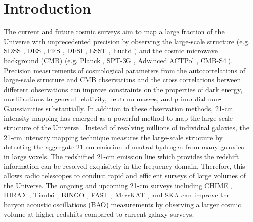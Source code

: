 \documentclass[prd,superscriptaddress,floatfix,notitlepage,nofootinbib,reprint]{revtex4-1}
\begin{document}
\maketitle

\section{Introduction}
The current and future cosmic surveys aim to map a large fraction of the 
Universe with unprecedented precision by observing the large-scale structure 
(e.g. SDSS \cite{2017SDSS}, DES \cite{2016DES}, PFS \cite{2014PFS}, DESI 
\cite{2016DESI}, LSST \cite{2009LSST}, Euclid \cite{2012Euclid}) and the cosmic
microwave background (CMB) (e.g. Planck \cite{2016Planck}, SPT-3G \cite{2014SPT-3G}, Advanced ACTPol \cite{2016AdvACTPol}, CMB-S4 \cite{2016CMB-S4}). 
Precision measurements of cosmological parameters from the autocorrelations
of large-scale structure and CMB observations and the cross correlations 
between different observations can improve constraints on the properties of 
dark energy, modifications to general relativity, neutrino masses, and 
primordial non-Gaussianities substantially.
In addition to these observation methods, 21-cm  intensity mapping has 
emerged as a powerful method to map the large-scale structure of the Universe 
\cite{2008IM,2008IM2,2010IM}. 
Instead of resolving millions of individual galaxies, the 21-cm intensity 
mapping technique measures the large-scale structure by detecting the aggregate 21-cm emission of neutral hydrogen from many galaxies in large voxels. 
The redshifted 21-cm emission line which provides the redshift information can 
be resolved exquisitely in the frequency domain.
Therefore, this allows radio telescopes to conduct rapid and efficient surveys
of large volumes of the Universe.
The ongoing and upcoming 21-cm surveys including CHIME \cite{2014CHIME}, HIRAX 
\cite{2016HIRAX}, Tianlai \cite{2015Tianlai}, BINGO \cite{2013BINGO}, FAST 
\cite{2016FAST}, MeerKAT \cite{2017MeerKAT}, and SKA \cite{2015SKA} can improve 
the baryon acoustic oscillations (BAO) measurements by observing a larger cosmic
volume at higher redshifts compared to current galaxy surveys.
\end{document}
